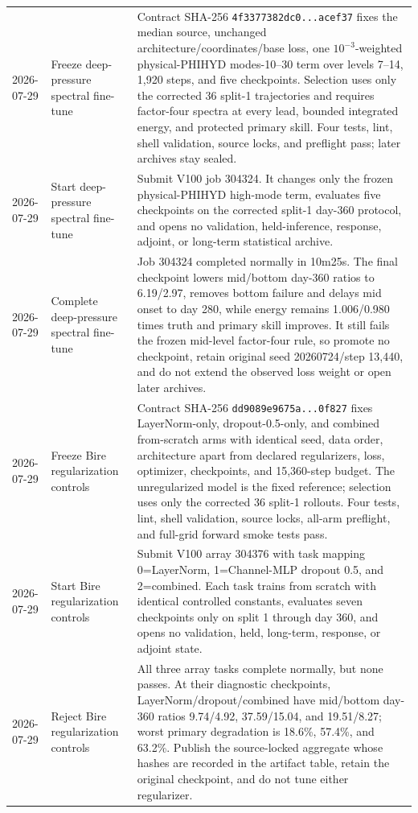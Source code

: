 \documentclass[11pt]{article}
\begin{document}
\begin{longtable}{@{}p{}p{}p{}@{}}
2026-07-29 & Freeze deep-pressure spectral fine-tune & Contract SHA-256 \texttt{4f3377382dc0...acef37} fixes the median source, unchanged architecture/coordinates/base loss, one \(10^{-3}\)-weighted physical-PHIHYD modes-10--30 term over levels 7--14, 1,920 steps, and five checkpoints.  Selection uses only the corrected 36 split-1 trajectories and requires factor-four spectra at every lead, bounded integrated energy, and protected primary skill.  Four tests, lint, shell validation, source locks, and preflight pass; later archives stay sealed. \\
2026-07-29 & Start deep-pressure spectral fine-tune & Submit V100 job 304324.  It changes only the frozen physical-PHIHYD high-mode term, evaluates five checkpoints on the corrected split-1 day-360 protocol, and opens no validation, held-inference, response, adjoint, or long-term statistical archive. \\
2026-07-29 & Complete deep-pressure spectral fine-tune & Job 304324 completed normally in 10m25s.  The final checkpoint lowers mid/bottom day-360 ratios to 6.19/2.97, removes bottom failure and delays mid onset to day 280, while energy remains 1.006/0.980 times truth and primary skill improves.  It still fails the frozen mid-level factor-four rule, so promote no checkpoint, retain original seed 20260724/step 13,440, and do not extend the observed loss weight or open later archives. \\
2026-07-29 & Freeze Bire regularization controls & Contract SHA-256 \texttt{dd9089e9675a...0f827} fixes LayerNorm-only, dropout-0.5-only, and combined from-scratch arms with identical seed, data order, architecture apart from declared regularizers, loss, optimizer, checkpoints, and 15,360-step budget.  The unregularized model is the fixed reference; selection uses only the corrected 36 split-1 rollouts.  Four tests, lint, shell validation, source locks, all-arm preflight, and full-grid forward smoke tests pass. \\
2026-07-29 & Start Bire regularization controls & Submit V100 array 304376 with task mapping 0=LayerNorm, 1=Channel-MLP dropout 0.5, and 2=combined.  Each task trains from scratch with identical controlled constants, evaluates seven checkpoints only on split 1 through day 360, and opens no validation, held, long-term, response, or adjoint state. \\
2026-07-29 & Reject Bire regularization controls & All three array tasks complete normally, but none passes.  At their diagnostic checkpoints, LayerNorm/dropout/combined have mid/bottom day-360 ratios 9.74/4.92, 37.59/15.04, and 19.51/8.27; worst primary degradation is 18.6\%, 57.4\%, and 63.2\%.  Publish the source-locked aggregate whose hashes are recorded in the artifact table, retain the original checkpoint, and do not tune either regularizer. \\

\end{longtable}
\end{document}

